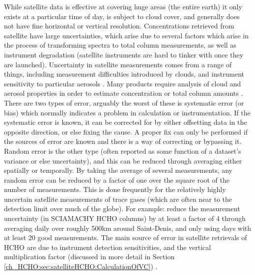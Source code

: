       While satellite data is effective at covering huge areas (the entire earth) it only exists at a particular time of day, is subject to cloud cover, and generally does not have fine horizontal or vertical resolution.
      Concentrations retrieved from satellite have large uncertainties, which arise due to several factors which arise in the process of transforming spectra to total column measurements, as well as instrument degradation (satellite instruments are hard to tinker with once they are launched).
      Uncertainty in satellite measurements comes from a range of things, including measurement difficulties introduced by clouds, and instrument sensitivity to particular aerosols \citep{Millet2006}.
      Many products require analysis of cloud and aerosol properties in order to estimate concentration or total column amounts \citep{Palmer2001,Palmer2003, Marais2012, Vasilkov2017}.
      There are two types of error, arguably the worst of these is systematic error (or bias) which normally indicates a problem in calculation or instrumentation.
      If the systematic error is known, it can be corrected for by either offsetting data in the opposite direction, or else fixing the cause.
      A proper fix can only be performed if the sources of error are known and there is a way of correcting or bypassing it.
      Random error is the other type (often reported as some function of a dataset's variance or else uncertainty), and this can be reduced through averaging either spatially or temporally. 
      By taking the average of several measurements, any random error can be reduced by a factor of one over the square root of the number of measurements.
      This is done frequently for the relatively highly uncertain satellite measurements of trace gases (which are often near to the detection limit over much of the globe).
      For example: \citet{Vigouroux2009} reduce the measurement uncertainty (in SCIAMACHY HCHO columns) by at least a factor of 4 through averaging daily over roughly 500km around Saint-Denis, and only using days with at least 20 good measurements.
      The main source of error in satellite retrievals of HCHO are due to instrument detection sensitivities, and the vertical multiplication factor (discussed in more detail in Section \ref{ch_HCHO:sec:satelliteHCHO:CalculationOfVC}) \citep{Millet2006}.
      
